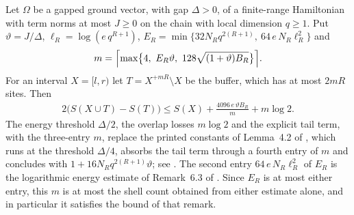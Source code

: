 \begin{lemma}
    \label{lem:chain_buffer_discount}
    \leanok
    Let $\Omega$ be a gapped ground vector, with gap $\Delta>0$, of a
    finite-range Hamiltonian with term norms at most $J\ge0$ on the chain with
    local dimension $q\ge1$. Put $\vartheta=J/\Delta$,
    $\ell_R=\log(e\,q^{R+1})$,
    $E_R=\min\{32N_Rq^{2(R+1)},\ 64\,e\,N_R\ell_R^2\}$ and
    \begin{align}
        m=\Bigl\lceil\max\bigl\{4,\ E_R\vartheta,\
        128\sqrt{(1+\vartheta)B_R}\bigr\}\Bigr\rceil .
    \end{align}
    For an interval $X=[l,r)$ let $T=X^{+mR}\setminus X$ be the buffer,
    which has at most $2mR$ sites. Then
    \begin{align}
        2\bigl(S(X\cup T)-S(T)\bigr)\le S(X)+
        \frac{4096\,e\,\vartheta B_R}{m}+m\log2 .
    \end{align}
    The energy threshold $\Delta/2$, the overlap losses $m\log2$ and the
    explicit tail term, with the three-entry $m$, replace the printed
    constants of Lemma~4.2 of \cite{TNLean2026OneDimensional}, which runs at
    the threshold $\Delta/4$, absorbs the tail term through a fourth entry of
    $m$ and concludes with $1+16N_Rq^{2(R+1)}\vartheta$; see
    \cite{gap:tnlean_one_dimensional_discount_constants}. The second entry
    $64\,e\,N_R\ell_R^2$ of $E_R$ is the logarithmic energy estimate of
    Remark~6.3 of \cite{TNLean2026OneDimensional}. Since $E_R$ is at most
    either entry, this $m$ is at most the shell count obtained from either
    estimate alone, and in particular it satisfies the bound of that remark.
\end{lemma}
